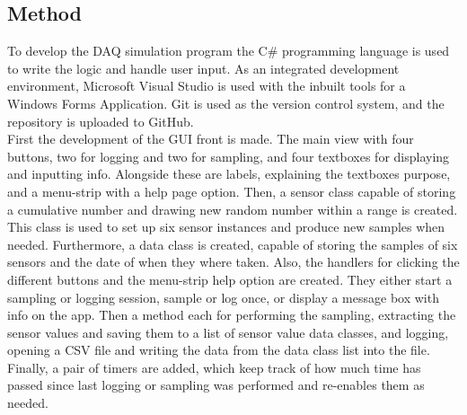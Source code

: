 \documentclass[11pt, A4paper, norsk]{article}
\begin{document}
		\subsection{Method}
To develop the DAQ simulation program the C\# programming language is used to write the logic and handle user input. As an integrated development environment, Microsoft Visual Studio is used with the inbuilt tools for a Windows Forms Application. Git is used as the version control system, and the repository is uploaded to GitHub. \\
First the development of the GUI front is made. The main view with four buttons, two for logging and two for sampling, and four textboxes for displaying and inputting info. Alongside these are labels, explaining the textboxes purpose, and a menu-strip with a help page option. Then, a sensor class capable of storing a cumulative number and drawing new random number within a range is created. This class is used to set up six sensor instances and produce new samples when needed. Furthermore, a data class is created, capable of storing the samples of six sensors and the date of when they where taken. Also, the handlers for clicking the different buttons and the menu-strip help option are created. They either start a sampling or logging session, sample or log once, or display a message box with info on the app. Then a method each for performing the sampling, extracting the sensor values and saving them to a list of sensor value data classes, and logging, opening a CSV file and writing the data from the data class list into the file. Finally, a pair of timers are added, which keep track of how much time has passed since last logging or sampling was performed and re-enables them as needed.
\end{document}

